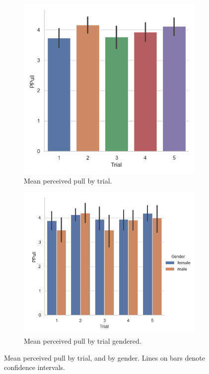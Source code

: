\begin{figure}[H]
 \begin{subfigure}[b]{0.5\textwidth}
     \centering
     \includegraphics[scale=0.5]{Files/Plots/ppull_by_trial_mean.png}
     \caption{Mean perceived pull by trial.}
     \label{fig:meanPpullTrial}
 \end{subfigure}
  \begin{subfigure}[b]{0.5\textwidth}
     \centering
     \includegraphics[scale=0.5]{Files/Plots/ppull_by_trial_mean_gen.png}
     \caption{Mean perceived pull by trial gendered.}
     \label{fig:meanPPullGenTrial}
 \end{subfigure}
     \caption{Mean perceived pull by trial, and by gender. Lines on bars denote confidence intervals.}
    \label{fig:ppullByTrial}
\end{figure}

